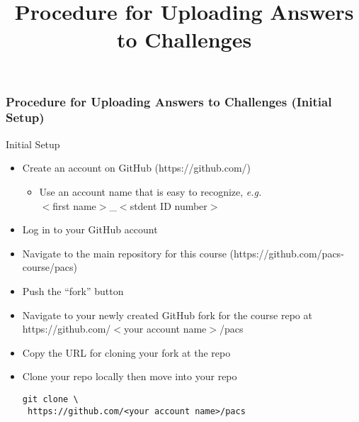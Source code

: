 \documentclass[smaller,a4paper,allowframebreaks]{beamer}
\begin{document}
\title{Procedure for Uploading Answers to Challenges}
\frame{\titlepage}


\begin{frame}\frametitle{Procedure for Uploading Answers to Challenges (Initial Setup)}
Initial Setup\\[3mm]
\begin{itemize}
\item Create an account on GitHub (https://github.com/)\\[3mm]
\begin{itemize}
\item Use an account name that is easy to recognize, {\it e.g.} \\
$<$first name$>$\_$<$stdent ID number$>$\\[3mm]
\end{itemize}
\item Log in to your GitHub account\\[3mm]
\item Navigate to the main repository for this course (https://github.com/pacs-course/pacs)\\[3mm]
\item Push the ``fork'' button\\[3mm]
\item Navigate to your newly created GitHub fork for the course repo at
https://github.com/$<$your account name$>$/pacs\\[3mm]
\item Copy the URL for cloning your fork at the repo\\[3mm]
\item Clone your repo locally then move into your repo 
\begin{lstlisting}
git clone \
 https://github.com/<your account name>/pacs
\end{lstlisting}
\end{itemize}
\end{frame}
\end{document}
